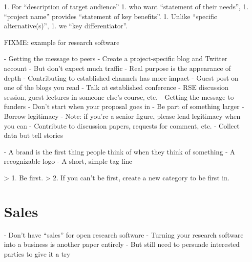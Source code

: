\documentclass[10pt,letterpaper]{article}
\begin{document}
1. For ``description of target audience''
1. who want ``statement of their needs'',
1. ``project name'' provides ``statement of key benefits''.
1. Unlike ``specific alternative(s)'',
1. we ``key differentiator''.

FIXME: example for research software

- Getting the message to peers
  - Create a project-specific blog and Twitter account
    - But don't expect much traffic
    - Real purpose is the appearance of depth
  - Contributing to established channels has more impact
    - Guest post on one of the blogs you read
    - Talk at established conference
    - RSE discussion session,
      guest lectures in someone else's course,
      etc.
- Getting the message to funders
  - Don't start when your proposal goes in
  - Be part of something larger
    - Borrow legitimacy
    - Note: if you're a senior figure, please lend legitimacy when you can
- Contribute to discussion papers, requests for comment, etc.
- Collect data but tell stories

- A brand is the first thing people think of when they think of something
  - A recognizable logo
  - A short, simple tag line

> 1. Be first.
> 2. If you can't be first, create a new category to be first in.

\section{Sales}

- Don't have ``sales'' for open research software
  - Turning your research software into a business is another paper entirely
- But still need to persuade interested parties to give it a try
\end{document}
